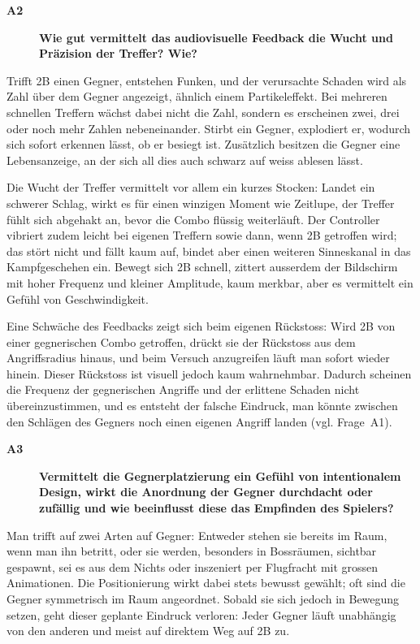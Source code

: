 \documentclass[../Main.tex]{subfiles}
\begin{document}
\begin{description}
    \item[\textbf{A2}] \textbf{Wie gut vermittelt das audiovisuelle Feedback die Wucht und Präzision der Treffer? Wie?}
\end{description}

\begingroup\color{red}Trifft 2B einen Gegner, entstehen Funken, und der verursachte Schaden wird als Zahl über dem Gegner angezeigt, ähnlich einem Partikeleffekt. Bei mehreren schnellen Treffern wächst dabei nicht die Zahl, sondern es erscheinen zwei, drei oder noch mehr Zahlen nebeneinander. Stirbt ein Gegner, explodiert er, wodurch sich sofort erkennen lässt, ob er besiegt ist. Zusätzlich besitzen die Gegner eine Lebensanzeige, an der sich all dies auch schwarz auf weiss ablesen lässt.

Die Wucht der Treffer vermittelt vor allem ein kurzes Stocken: Landet ein schwerer Schlag, wirkt es für einen winzigen Moment wie Zeitlupe, der Treffer fühlt sich abgehakt an, bevor die Combo flüssig weiterläuft. Der Controller vibriert zudem leicht bei eigenen Treffern sowie dann, wenn 2B getroffen wird; das stört nicht und fällt kaum auf, bindet aber einen weiteren Sinneskanal in das Kampfgeschehen ein. Bewegt sich 2B schnell, zittert ausserdem der Bildschirm mit hoher Frequenz und kleiner Amplitude, kaum merkbar, aber es vermittelt ein Gefühl von Geschwindigkeit.\endgroup

Eine Schwäche des Feedbacks zeigt sich beim eigenen Rückstoss: Wird 2B von einer gegnerischen Combo getroffen, drückt sie der Rückstoss aus dem Angriffsradius hinaus, und beim Versuch anzugreifen läuft man sofort wieder hinein. Dieser Rückstoss ist visuell jedoch kaum wahrnehmbar. Dadurch scheinen die Frequenz der gegnerischen Angriffe und der erlittene Schaden nicht übereinzustimmen, und es entsteht der falsche Eindruck, man könnte zwischen den Schlägen des Gegners noch einen eigenen Angriff landen (vgl. Frage~A1).

\begin{description}
    \item[\textbf{A3}] \textbf{Vermittelt die Gegnerplatzierung ein Gefühl von intentionalem Design, wirkt die Anordnung der Gegner durchdacht oder zufällig und wie beeinflusst diese das Empfinden des Spielers?}
\end{description}

Man trifft auf zwei Arten auf Gegner: Entweder stehen sie bereits im Raum, wenn man ihn betritt, oder sie werden, besonders in Bossräumen, sichtbar gespawnt, sei es aus dem Nichts oder inszeniert per Flugfracht mit grossen Animationen. Die Positionierung wirkt dabei stets bewusst gewählt; oft sind die Gegner symmetrisch im Raum angeordnet. Sobald sie sich jedoch in Bewegung setzen, geht dieser geplante Eindruck verloren: Jeder Gegner läuft unabhängig von den anderen und meist auf direktem Weg auf 2B zu.
\end{document}
